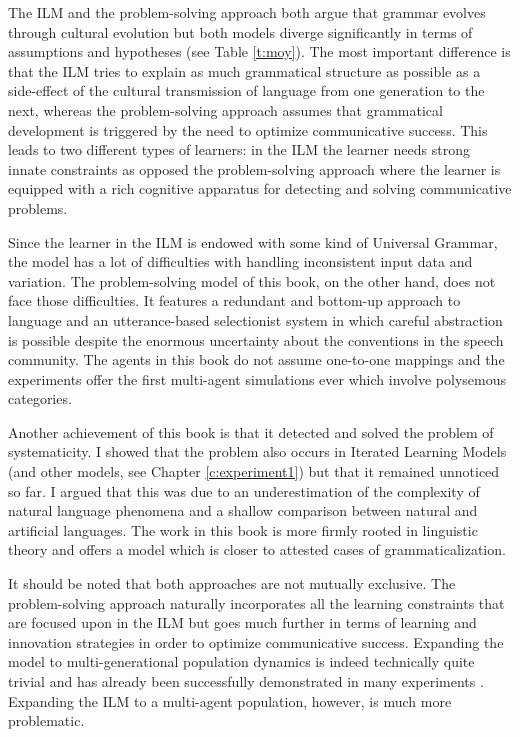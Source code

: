 The ILM and the problem-solving approach both argue that grammar evolves through cultural evolution but both models diverge significantly in terms of assumptions and hypotheses (see Table \ref{t:moy}). The most important difference is that the ILM tries to explain as much grammatical structure as possible as a side-effect of the cultural transmission of language from one generation to the next, whereas the problem-solving approach assumes that grammatical development is triggered by the need to optimize communicative success. This leads to two different types of learners: in the ILM the learner needs strong innate constraints as opposed the problem-solving approach where the learner is equipped with a rich cognitive apparatus for detecting and solving communicative problems.

Since the learner in the ILM is endowed with some kind of Universal Grammar, the model has a lot of difficulties with handling inconsistent input data and variation. The problem-solving model of this book, on the other hand, does not face those difficulties. It features a redundant and bottom-up approach to language and an utterance-based selectionist system in which careful abstraction is possible despite the enormous uncertainty about the conventions in the speech community. The agents in this book do not assume one-to-one mappings and the experiments offer the first multi-agent simulations ever which involve polysemous categories.

Another achievement of this book is that it detected and solved the problem of systematicity. I showed that the problem also occurs in Iterated Learning Models (and other models, see Chapter \ref{c:experiment1}) but that it remained unnoticed so far. I argued that this was due to an underestimation of the complexity of natural language phenomena and a shallow comparison between natural and artificial languages. The work in this book is more firmly rooted in linguistic theory and offers a model which is closer to attested cases of grammaticalization.

It should be noted that both approaches are not mutually exclusive. The problem-solving approach naturally incorporates all the learning constraints that are focused upon in the ILM but goes much further in terms of learning and innovation strategies in order to optimize communicative success. Expanding the model to multi-generational population dynamics is indeed technically quite trivial and has already been successfully demonstrated in many experiments \citep[e.g.][]{debeule08emergence, steels99spatially}. Expanding the ILM to a multi-agent population, however, is much more problematic.


